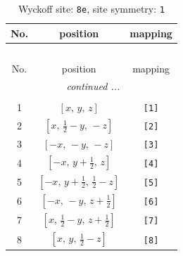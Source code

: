 \documentclass[fleqn,8pt]{jsarticle}
\begin{document}
\renewcommand{\arraystretch}{1.2}
\begin{longtable}{ccc}
\caption{Wyckoff site: {\tt 8e}, site symmetry: {\tt 1}}
 \\
 \hline \hline
No. & position & mapping \\ \hline \endfirsthead

\multicolumn{2}{l}{\tablename\ \thetable{}} \\
 \hline \hline
No. & position & mapping \\ \hline \endhead

 \hline \hline
\multicolumn{2}{r}{\footnotesize\it continued ...} \\ \endfoot

 \hline \hline
\multicolumn{2}{r}{} \\ \endlastfoot

1 & $\left[ x,\, y,\, z \right]$ & {\tt [1]} \\ \hline
2 & $\left[ x,\, \frac{1}{2} - y,\, - z \right]$ & {\tt [2]} \\ \hline
3 & $\left[ - x,\, - y,\, - z \right]$ & {\tt [3]} \\ \hline
4 & $\left[ - x,\, y + \frac{1}{2},\, z \right]$ & {\tt [4]} \\ \hline
5 & $\left[ - x,\, y + \frac{1}{2},\, \frac{1}{2} - z \right]$ & {\tt [5]} \\ \hline
6 & $\left[ - x,\, - y,\, z + \frac{1}{2} \right]$ & {\tt [6]} \\ \hline
7 & $\left[ x,\, \frac{1}{2} - y,\, z + \frac{1}{2} \right]$ & {\tt [7]} \\ \hline
8 & $\left[ x,\, y,\, \frac{1}{2} - z \right]$ & {\tt [8]} \\
\end{longtable}
\end{document}
